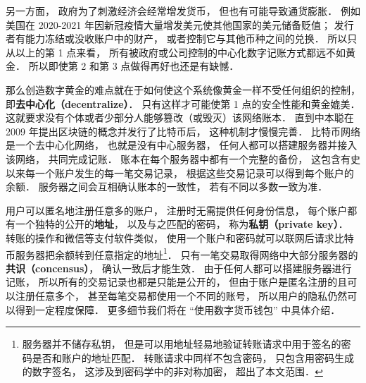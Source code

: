 另一方面， 政府为了刺激经济会经常增发货币， 但也有可能导致通货膨胀． 例如美国在 2020-2021 年因新冠疫情大量增发美元使其他国家的美元储备贬值； 发行者有能力冻结或没收账户中的财产， 或者控制它与其他币种之间的兑换． 所以只从以上的第 1 点来看， 所有被政府或公司控制的中心化数字记账方式都远不如黄金． 所以即使第 2 和第 3 点做得再好也还是有缺憾．

那么创造数字黄金的难点就在于如何使这个系统像黄金一样不受任何组织的控制， 即\textbf{去中心化（decentralize）}． 只有这样才可能使第 1 点的安全性能和黄金媲美． 这就要求没有个体或者少部分人能够篡改（或毁灭）该网络账本． 直到中本聪在 2009 年提出区块链的概念并发行了比特币后， 这种机制才慢慢完善． 比特币网络是一个去中心化网络， 也就是没有中心服务器， 任何人都可以搭建服务器并接入该网络， 共同完成记账． 账本在每个服务器中都有一个完整的备份， 这包含有史以来每一个账户发生的每一笔交易记录， 根据这些交易记录可以得到每个账户的余额． 服务器之间会互相确认账本的一致性， 若有不同以多数一致为准．

用户可以匿名地注册任意多的账户， 注册时无需提供任何身份信息， 每个账户都有一个独特的公开的\textbf{地址}， 以及与之匹配的密码， 称为\textbf{私钥（private key）}． 转账的操作和微信等支付软件类似， 使用一个账户和密码就可以联网后请求比特币服务器把余额转到任意指定的地址\footnote{服务器并不储存私钥， 但是可以用地址轻易地验证转账请求中用于签名的密码是否和账户的地址匹配． 转账请求中同样不包含密码， 只包含用密码生成的数字签名， 这涉及到密码学中的非对称加密， 超出了本文范围．}． 只有一笔交易取得网络中大部分服务器的\textbf{共识（concensus）}， 确认一致后才能生效． 由于任何人都可以搭建服务器进行记账， 所以所有的交易记录也都是只能是公开的， 但由于账户是匿名注册的且可以注册任意多个， 甚至每笔交易都使用一个不同的账号， 所以用户的隐私仍然可以得到一定程度保障． 更多细节我们将在 “使用数字货币钱包” 中具体介绍．


